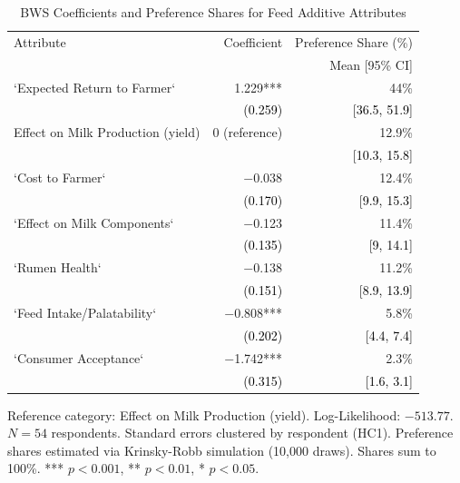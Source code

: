 \begin{table}[H]
\centering
\caption{BWS Coefficients and Preference Shares for Feed Additive Attributes}
\label{tab:support_bws}
\begin{threeparttable}
\begin{tabular}{lrr}
\toprule
Attribute & Coefficient & \multicolumn{1}{r}{Preference Share (\%)} \\
          &             & \multicolumn{1}{r}{Mean [95\% CI]} \\
\midrule
`Expected Return to Farmer` & 1.229*** & 44\% \\
 & {\small\textcolor{black}{(0.259)}} & {\small\textcolor{black}{[36.5, 51.9]}} \\
\addlinespace[4pt]
Effect on Milk Production (yield) & 0 (reference) & 12.9\% \\
 & {\small\textcolor{black}{}} & {\small\textcolor{black}{[10.3, 15.8]}} \\
\addlinespace[4pt]
`Cost to Farmer` & $-$0.038 & 12.4\% \\
 & {\small\textcolor{black}{(0.170)}} & {\small\textcolor{black}{[9.9, 15.3]}} \\
\addlinespace[4pt]
`Effect on Milk Components` & $-$0.123 & 11.4\% \\
 & {\small\textcolor{black}{(0.135)}} & {\small\textcolor{black}{[9, 14.1]}} \\
\addlinespace[4pt]
`Rumen Health` & $-$0.138 & 11.2\% \\
 & {\small\textcolor{black}{(0.151)}} & {\small\textcolor{black}{[8.9, 13.9]}} \\
\addlinespace[4pt]
`Feed Intake/Palatability` & $-$0.808*** & 5.8\% \\
 & {\small\textcolor{black}{(0.202)}} & {\small\textcolor{black}{[4.4, 7.4]}} \\
\addlinespace[4pt]
`Consumer Acceptance` & $-$1.742*** & 2.3\% \\
 & {\small\textcolor{black}{(0.315)}} & {\small\textcolor{black}{[1.6, 3.1]}} \\
\bottomrule
\end{tabular}
\begin{tablenotes}[flushleft]
\footnotesize
\item Reference category: Effect on Milk Production (yield). Log-Likelihood: $-513.77$. $N = 54$ respondents. Standard errors clustered by respondent (HC1). Preference shares estimated via Krinsky-Robb simulation (10{,}000 draws). Shares sum to 100\%. *** $p < 0.001$, ** $p < 0.01$, * $p < 0.05$.
\end{tablenotes}
\end{threeparttable}
\end{table}
